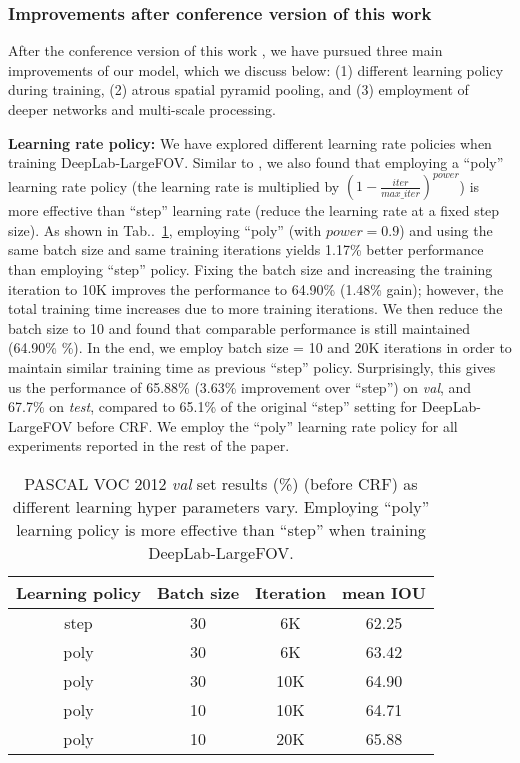 \documentclass[10pt,journal,compsoc]{IEEEtran}
\makeatletter
\newcommand{\tabref}[1]{Tab\onedot~\ref{#1}}
\def\onedot{\ifx\@let@token.\else.\null\fi\xspace}
\makeatother
\begin{document}
\subsubsection{Improvements after conference version of this work}
After the conference version of this work \cite{chen2014semantic}, we have
pursued three main improvements of our model, which we discuss below:
(1) different learning policy during training, (2) atrous spatial pyramid
pooling, and (3) employment of deeper networks and multi-scale processing.

\textbf{Learning rate policy:} We have explored different learning rate
policies when training DeepLab-LargeFOV. Similar to \cite{liu2015parsenet},
we also found that employing a ``poly'' learning rate policy (the learning
rate is multiplied by $(1-\frac{iter}{max\_iter})^{power}$) is more effective
than ``step'' learning rate (reduce the learning rate at a fixed step size).
As shown in \tabref{tab:val_poly}, employing ``poly'' (with $power = 0.9$)
and using the same batch size and same training iterations yields 1.17\% better
performance than employing ``step'' policy. Fixing the batch size and increasing
the training iteration to 10K improves the performance to 64.90\% (1.48\% gain);
however, the total training time increases due to more training iterations. We
then reduce the batch size to 10 and found that comparable performance is still
maintained (64.90\% \%). In the end, we employ batch size = 10 and
20K iterations in order to maintain similar training time as previous ``step''
policy. Surprisingly, this gives us the performance of 65.88\% (3.63\%
improvement over ``step'') on \textit{val}, and 67.7\% on \textit{test},
compared to 65.1\% of the original ``step'' setting for DeepLab-LargeFOV before
CRF. We employ the ``poly'' learning rate policy for all experiments reported in
the rest of the paper.

\begin{table}[!t]
  \centering
  \addtolength{\tabcolsep}{2.5pt}
  \begin{tabular}{c c c c}
    \toprule[0.2 em]
    {\bf Learning policy} & {\bf Batch size} & {\bf Iteration} & {\bf mean IOU} \\
    \toprule[0.2em]
    step & 30 & 6K & 62.25 \\
    \midrule
    poly & 30 & 6K & 63.42 \\
    poly & 30 & 10K & 64.90 \\
    poly & 10 & 10K & 64.71 \\
    poly & 10 & 20K & 65.88 \\
    \bottomrule[0.1em]
  \end{tabular}
  \caption{PASCAL VOC 2012 \textit{val} set results (\%) (before CRF) as
    different learning hyper parameters vary. Employing ``poly'' learning
    policy is more effective than ``step'' when training DeepLab-LargeFOV.}
  \label{tab:val_poly}
\end{table}
\end{document}
